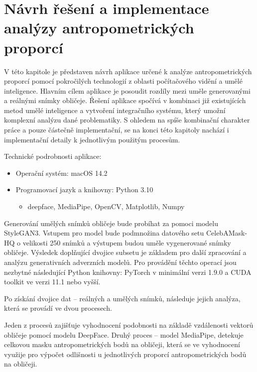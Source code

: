 \chapter{Návrh řešení a implementace analýzy antropometrických proporcí}

V této kapitole je představen návrh aplikace určené k analýze antropometrických proporcí pomocí pokročilých technologií z oblasti počítačového vidění a umělé inteligence. Hlavním cílem aplikace je posoudit rozdíly mezi uměle generovanými a reálnými snímky obličeje. Řešení aplikace spočívá v kombinaci již existujících metod umělé inteligence a vytvoření integračního systému, který umožní komplexní analýzu dané problematiky. S ohledem na spíše kombinační charakter práce a pouze částečně implementační, se na konci této kapitoly nachází i implementační detaily k jednotlivým použitým procesům.

\bigskip

\noindent Technické podrobnosti aplikace:

\begin{itemize}
    \item Operační systém: macOS 14.2
    \item Programovací jazyk a knihovny: Python 3.10
            \begin{itemize}
            \item deepface, MediaPipe, OpenCV, Matplotlib, Numpy
        \end{itemize}
\end{itemize}

\noindent Generování umělých snímků obličeje bude probíhat za pomoci modelu StyleGAN3. Vstupem pro model bude podmnožina datového setu CelebAMask-HQ o velikosti 250 snímků a výstupem budou uměle vygenerované snímky obličeje. Výsledek doplňující dvojice subsetu je základem pro další zpracování a analýzu generativních adverzních modelů. Pro provádění těchto operací jsou nezbytné následující Python knihovny: PyTorch v minimální verzi 1.9.0 a CUDA toolkit ve verzi 11.1 nebo vyšší.

\bigskip

\noindent Po získání dvojice dat -- reálných a umělých snímků, následuje jejich analýza, která se provádí ve dvou procesech.

Jeden z procesů zajišťuje vyhodnocení podobnosti na základě vzdálenosti vektorů obličeje pomocí modelu DeepFace. Druhý proces -- model MediaPipe, detekuje celkovou masku antropometrických bodů na obličeji, která se ve vyhodnocení využije pro výpočet odlišnosti u jednotlivých proporcí antropometrických bodů na obličeji.

